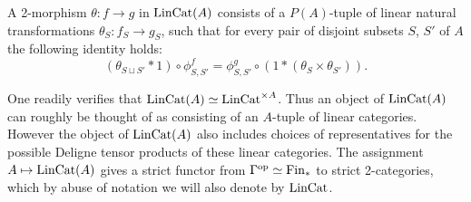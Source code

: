 \documentclass{amsart}
\begin{document}
A 2-morphism $\theta: f \to g$ in $\mathrm{LinCat}(A)$ consists of a $P(A)$-tuple of linear natural transformations $\theta_S: f_S \to g_S$, such that for every pair of disjoint subsets $S$, $S'$ of $A$ the following identity holds: 
\begin{equation*}
	(\theta_{S\sqcup S'}* 1) \circ \phi^f_{S,S'} = \phi^g_{S,S'} \circ (1 * (\theta_S \times \theta_{S'})).
\end{equation*}

One readily verifies that $\mathrm{LinCat}(A) \simeq \mathrm{LinCat}^{\times A}$. Thus an object of $\mathrm{LinCat}(A)$ can roughly be thought of as consisting of an $A$-tuple of linear categories. However the object of $\mathrm{LinCat}(A)$ also includes choices of representatives for the possible Deligne tensor products of these linear categories. The assignment $A \mapsto \mathrm{LinCat}(A)$ gives a strict functor from $\Gamma^{\mathrm{op}} \simeq \mathrm{Fin}_*$ to strict 2-categories, which by abuse of notation we will also denote by $\mathrm{LinCat}$. 









\end{document}

